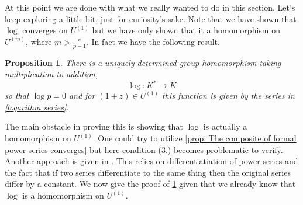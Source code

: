 \documentclass{article}
\newtheorem{proposition}{Proposition}[section]
\numberwithin{equation}{section}
\begin{document}
At this point we are done with what we really wanted to do in this section. Let's keep exploring a little bit, just for curiosity's sake. Note that we have shown that $\log$ converges on $U^{(1)}$ but we have only shown that it a homomorphism on $U^{(m)}$, where $m > \frac{e}{p-1}$. In fact we have the following result.
\begin{proposition}\label{prop: Improved log}
	There is a uniquely determined group homomorphism taking multiplication to addition,
	$$\log : K^* \to K$$
	so that $\log p = 0$ and for $(1 + z) \in U^{(1)}$ this function is given by the series in \cref{logarithm series}.
\end{proposition}

The main obstacle in proving this is showing that $\log$ is actually a homomorphism on $U^{(1)}$. One could try to utilize \cref{prop: The composite of formal power series converges} but here condition (3.) becomes problematic to verify. Another approach is given in \citep[Proposition 5.7.3]{gouvea}. This relies on differentiatiation of power series and the fact that if two series differentiate to the same thing then the original series differ by a constant. We now give the proof of \cref{prop: Improved log} given that we already know that $\log$ is a homomorphism on $U^{(1)}$.
\end{document}
